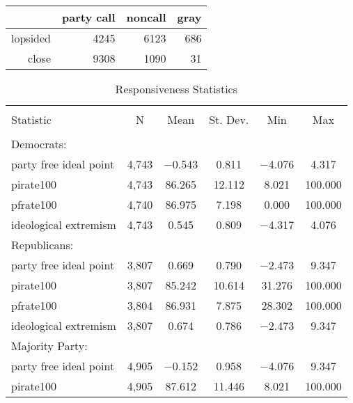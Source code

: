 \documentclass[12pt]{article}
\begin{document}
\begin{table}[ht]
	\centering
	\begin{tabular}{rrrr}
		\hline
		& party call & noncall & gray \\ 
		\hline
		lopsided & 4245 & 6123 & 686 \\ 
		close & 9308 & 1090 &  31 \\ 
		\hline
	\end{tabular}
\end{table}

\begin{table}[!htbp] \centering 
	\caption{Responsiveness Statistics} 
	\label{} 
	\begin{tabular}{@{\extracolsep{5pt}}lccccc} 
		\\[-1.8ex]\hline 
		\hline \\[-1.8ex] 
		Statistic & \multicolumn{1}{c}{N} & \multicolumn{1}{c}{Mean} & \multicolumn{1}{c}{St. Dev.} & \multicolumn{1}{c}{Min} & \multicolumn{1}{c}{Max} \\ 
		\hline \\[-1.8ex] 
		Democrats: & & & & & \\
		\hline
		party free ideal point & 4,743 & $-$0.543 & 0.811 & $-$4.076 & 4.317 \\ 
		pirate100 & 4,743 & 86.265 & 12.112 & 8.021 & 100.000 \\ 
		pfrate100 & 4,740 & 86.975 & 7.198 & 0.000 & 100.000 \\ 
		ideological extremism & 4,743 & 0.545 & 0.809 & $-$4.317 & 4.076 \\ 
		\hline
		Republicans: & & & & & \\
		\hline
		party free ideal point & 3,807 & 0.669 & 0.790 & $-$2.473 & 9.347 \\ 
		pirate100 & 3,807 & 85.242 & 10.614 & 31.276 & 100.000 \\ 
		pfrate100 & 3,804 & 86.931 & 7.875 & 28.302 & 100.000 \\ 
		ideological extremism & 3,807 & 0.674 & 0.786 & $-$2.473 & 9.347 \\ 
		\hline
		Majority Party: & & & & & \\
		\hline
		party free ideal point & 4,905 & $-$0.152 & 0.958 & $-$4.076 & 9.347 \\ 
		pirate100 & 4,905 & 87.612 & 11.446 & 8.021 & 100.000 \\ 

\end{tabular}
\end{table}
\end{document}
